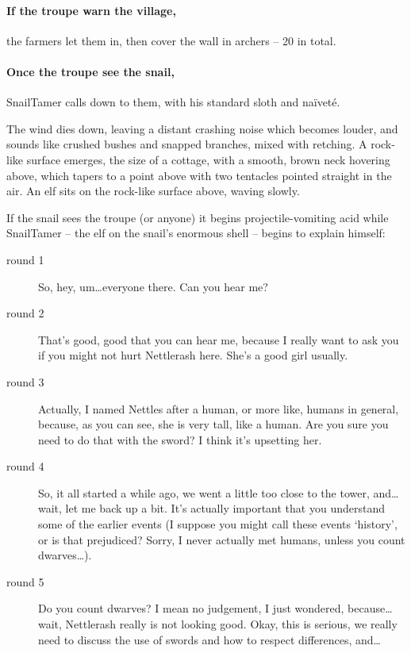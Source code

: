 \paragraph{If the troupe warn the \gls{village},}
the farmers let them in, then cover the wall in archers -- 20 in total.

\paragraph{Once the troupe see the snail,}
\gls{SnailTamer} calls down to them, with his standard sloth and na\"ivet\'e.

\begin{boxtext}
  The wind dies down, leaving a distant crashing noise which becomes louder, and sounds like crushed bushes and snapped branches, mixed with  retching.
  A rock-like surface emerges, the size of a cottage, with a smooth, brown neck hovering above, which tapers to a point above with two tentacles pointed straight in the air.
  An elf sits on the rock-like surface above, waving slowly.
\end{boxtext}

\SnailTamer

If the snail sees the troupe (or anyone) it begins projectile-vomiting acid while \gls{SnailTamer} -- the elf on the snail's enormous shell -- begins to explain himself:

\begin{description}
  \item[round 1] So, hey, um\ldots everyone there.
  Can you hear me?

  \item[round 2] That's good, good that you can hear me, because I really want to ask you if you might not hurt Nettlerash here.
  She's a good girl usually.

  \item[round 3] Actually, I named Nettles after a human, or more like, humans in general, because, as you can see, she is very tall, like a human.
  Are you sure you need to do that with the sword?
  I think it's upsetting her.

  \item[round 4] So, it all started a while ago, we went a little too close to the tower, and\ldots wait, let me back up a bit.
  It's actually important that you understand some of the earlier events (I suppose you might call these events `history', or is that prejudiced?
  Sorry, I never actually met humans, unless you count dwarves\ldots).

  \item[round 5] Do you count dwarves?
  I mean no judgement, I just wondered, because\ldots wait, Nettlerash really is not looking good.
  Okay, this is serious, we really need to discuss the use of swords and how to respect differences, and\ldots
\end{description}

